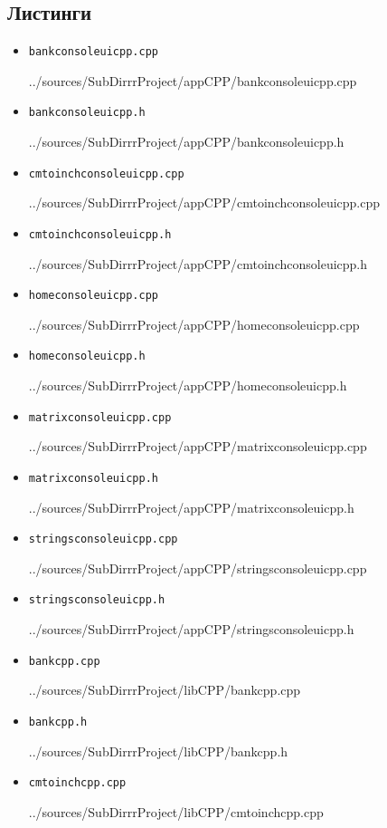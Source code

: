\documentclass[12pt,a4paper]{report}
\begin{document}
\subsection*{Листинги}
\begin{itemize}

\item[] \verb-bankconsoleuicpp.cpp-

{../sources/SubDirrrProject/appCPP/bankconsoleuicpp.cpp}

\item[] \verb-bankconsoleuicpp.h-

{../sources/SubDirrrProject/appCPP/bankconsoleuicpp.h}

\item[] \verb-cmtoinchconsoleuicpp.cpp-

{../sources/SubDirrrProject/appCPP/cmtoinchconsoleuicpp.cpp}

\item[] \verb-cmtoinchconsoleuicpp.h-

{../sources/SubDirrrProject/appCPP/cmtoinchconsoleuicpp.h}

\item[] \verb-homeconsoleuicpp.cpp-

{../sources/SubDirrrProject/appCPP/homeconsoleuicpp.cpp}

\item[] \verb-homeconsoleuicpp.h-

{../sources/SubDirrrProject/appCPP/homeconsoleuicpp.h}

\item[] \verb-matrixconsoleuicpp.cpp-

{../sources/SubDirrrProject/appCPP/matrixconsoleuicpp.cpp}

\item[] \verb-matrixconsoleuicpp.h-

{../sources/SubDirrrProject/appCPP/matrixconsoleuicpp.h}

\item[] \verb-stringsconsoleuicpp.cpp-

{../sources/SubDirrrProject/appCPP/stringsconsoleuicpp.cpp}

\item[] \verb-stringsconsoleuicpp.h-

{../sources/SubDirrrProject/appCPP/stringsconsoleuicpp.h}

\item[] \verb-bankcpp.cpp-

{../sources/SubDirrrProject/libCPP/bankcpp.cpp}

\item[] \verb-bankcpp.h-

{../sources/SubDirrrProject/libCPP/bankcpp.h}

\item[] \verb-cmtoinchcpp.cpp-

{../sources/SubDirrrProject/libCPP/cmtoinchcpp.cpp}


\end{itemize}
\end{document}
